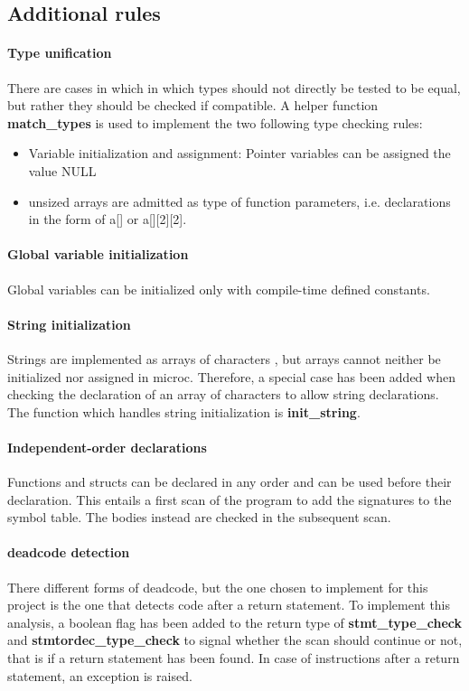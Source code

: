 \documentclass{article}
\begin{document}
\subsection*{Additional rules}
\paragraph*{Type unification}
   There are cases in which in which types should not directly be tested to be equal, but rather they should be checked if compatible.
   A helper function \textbf{match\_types} is used to implement the two following type checking rules:
    \begin{itemize}
        \item Variable initialization and assignment: Pointer variables can be assigned the value NULL
        \item unsized arrays are admitted as type of function parameters, i.e. declarations in the form of a[] or a[][2][2].
    \end{itemize}

\paragraph*{Global variable initialization}
Global variables can be initialized only with compile-time defined constants.

\paragraph*{String initialization}
Strings are implemented as arrays of characters , but arrays cannot neither be initialized nor assigned in microc.
Therefore, a special case has been added when checking the declaration of an array of characters to allow string declarations.
The function which handles string initialization is \textbf{init\_string}.

\paragraph*{Independent-order declarations}
Functions and structs can be declared in any order and can be used before their declaration.
This entails a first scan of the program to add the signatures to the
symbol table. The bodies instead are checked in the subsequent scan.

\paragraph*{deadcode detection}
There different forms of deadcode, but the one chosen to implement for this project is the one
that detects code after a return statement.
To implement this analysis, a boolean flag has been added to the return type of \textbf{stmt\_type\_check} and \textbf{stmtordec\_type\_check}
to signal whether the scan should continue or not, that is if a return statement has been found.
In case of instructions after a return statement, an exception is raised.
\end{document}
